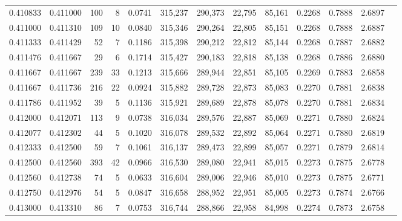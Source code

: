 \begin{tabular}{rrrrrrrrrrrrr}
0.410833 & 0.411000 &   100 &   8 &                                     0.0741 & 315,237 & 290,373 &  22,795 &  85,161 & 0.2268 & 0.7888 & 2.6897 \\
0.411000 & 0.411310 &   109 &  10 &                                     0.0840 & 315,346 & 290,264 &  22,805 &  85,151 & 0.2268 & 0.7888 & 2.6887 \\
0.411333 & 0.411429 &    52 &   7 &                                     0.1186 & 315,398 & 290,212 &  22,812 &  85,144 & 0.2268 & 0.7887 & 2.6882 \\
0.411476 & 0.411667 &    29 &   6 &                                     0.1714 & 315,427 & 290,183 &  22,818 &  85,138 & 0.2268 & 0.7886 & 2.6880 \\
0.411667 & 0.411667 &   239 &  33 &                                     0.1213 & 315,666 & 289,944 &  22,851 &  85,105 & 0.2269 & 0.7883 & 2.6858 \\
0.411667 & 0.411736 &   216 &  22 &                                     0.0924 & 315,882 & 289,728 &  22,873 &  85,083 & 0.2270 & 0.7881 & 2.6838 \\
0.411786 & 0.411952 &    39 &   5 &                                     0.1136 & 315,921 & 289,689 &  22,878 &  85,078 & 0.2270 & 0.7881 & 2.6834 \\
0.412000 & 0.412071 &   113 &   9 &                                     0.0738 & 316,034 & 289,576 &  22,887 &  85,069 & 0.2271 & 0.7880 & 2.6824 \\
0.412077 & 0.412302 &    44 &   5 &                                     0.1020 & 316,078 & 289,532 &  22,892 &  85,064 & 0.2271 & 0.7880 & 2.6819 \\
0.412333 & 0.412500 &    59 &   7 &                                     0.1061 & 316,137 & 289,473 &  22,899 &  85,057 & 0.2271 & 0.7879 & 2.6814 \\
0.412500 & 0.412560 &   393 &  42 &                                     0.0966 & 316,530 & 289,080 &  22,941 &  85,015 & 0.2273 & 0.7875 & 2.6778 \\
0.412560 & 0.412738 &    74 &   5 &                                     0.0633 & 316,604 & 289,006 &  22,946 &  85,010 & 0.2273 & 0.7875 & 2.6771 \\
0.412750 & 0.412976 &    54 &   5 &                                     0.0847 & 316,658 & 288,952 &  22,951 &  85,005 & 0.2273 & 0.7874 & 2.6766 \\
0.413000 & 0.413310 &    86 &   7 &                                     0.0753 & 316,744 & 288,866 &  22,958 &  84,998 & 0.2274 & 0.7873 & 2.6758 \\

\end{tabular}
